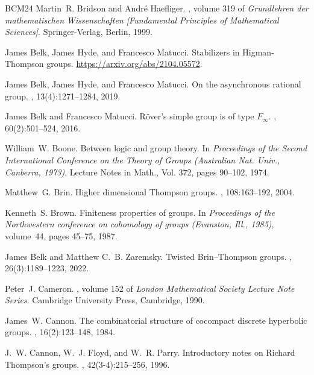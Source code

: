 \documentclass[11pt,letterpaper]{amsart}
\theoremstyle{definition}
\begin{document}
\begin{thebibliography}{BCM{\etalchar{+}}24}
Martin~R. Bridson and Andr\'{e} Haefliger.
, volume 319 of {\em
  Grundlehren der mathematischen Wissenschaften [Fundamental Principles of
  Mathematical Sciences]}.
\newblock Springer-Verlag, Berlin, 1999.

James Belk, James Hyde, and Francesco Matucci.
\newblock Stabilizers in {H}igman-{T}hompson groups.
\newblock \url{https://arxiv.org/abs/2104.05572}.

James Belk, James Hyde, and Francesco Matucci.
\newblock On the asynchronous rational group.
, 13(4):1271--1284, 2019.

James Belk and Francesco Matucci.
\newblock R\"{o}ver's simple group is of type {$F_\infty$}.
, 60(2):501--524, 2016.

William~W. Boone.
\newblock Between logic and group theory.
\newblock In {\em Proceedings of the {S}econd {I}nternational {C}onference on
  the {T}heory of {G}roups ({A}ustralian {N}at. {U}niv., {C}anberra, 1973)},
  Lecture Notes in Math., Vol. 372, pages 90--102, 1974.

Matthew~G. Brin.
\newblock Higher dimensional {T}hompson groups.
, 108:163--192, 2004.

Kenneth~S. Brown.
\newblock Finiteness properties of groups.
\newblock In {\em Proceedings of the {N}orthwestern conference on cohomology of
  groups ({E}vanston, {I}ll., 1985)}, volume~44, pages 45--75, 1987.

James Belk and Matthew C.~B. Zaremsky.
\newblock Twisted {B}rin--{T}hompson groups.
, 26(3):1189--1223, 2022.

Peter~J. Cameron.
, volume 152 of {\em London
  Mathematical Society Lecture Note Series}.
\newblock Cambridge University Press, Cambridge, 1990.

James~W. Cannon.
\newblock The combinatorial structure of cocompact discrete hyperbolic groups.
, 16(2):123--148, 1984.

J.~W. Cannon, W.~J. Floyd, and W.~R. Parry.
\newblock Introductory notes on {R}ichard {T}hompson's groups.
, 42(3-4):215--256, 1996.


\end{thebibliography}
\end{document}
